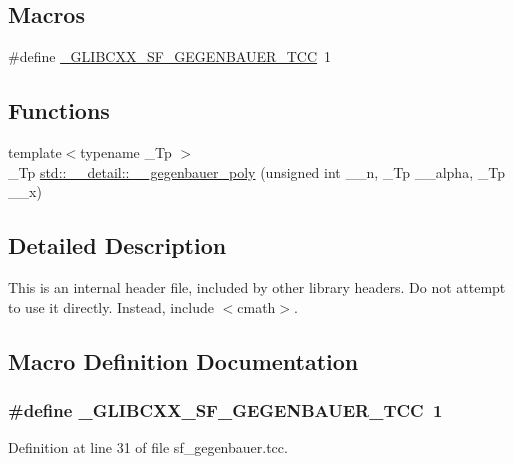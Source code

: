 \subsection*{Macros}
\begin{DoxyCompactItemize}
\item 
\#define \hyperlink{sf__gegenbauer_8tcc_abd7e8b1c4ef4ccdebedccbe78bb8e31b}{\+\_\+\+G\+L\+I\+B\+C\+X\+X\+\_\+\+S\+F\+\_\+\+G\+E\+G\+E\+N\+B\+A\+U\+E\+R\+\_\+\+T\+CC}~1
\end{DoxyCompactItemize}
\subsection*{Functions}
\begin{DoxyCompactItemize}
\item 
{\footnotesize template$<$typename \+\_\+\+Tp $>$ }\\\+\_\+\+Tp \hyperlink{namespacestd_1_1____detail_a5c2319a50d89d8067a46750708bf8563}{std\+::\+\_\+\+\_\+detail\+::\+\_\+\+\_\+gegenbauer\+\_\+poly} (unsigned int \+\_\+\+\_\+n, \+\_\+\+Tp \+\_\+\+\_\+alpha, \+\_\+\+Tp \+\_\+\+\_\+x)
\end{DoxyCompactItemize}


\subsection{Detailed Description}
This is an internal header file, included by other library headers. Do not attempt to use it directly. Instead, include $<$cmath$>$. 

\subsection{Macro Definition Documentation}
\subsubsection[{\texorpdfstring{\+\_\+\+G\+L\+I\+B\+C\+X\+X\+\_\+\+S\+F\+\_\+\+G\+E\+G\+E\+N\+B\+A\+U\+E\+R\+\_\+\+T\+CC}{_GLIBCXX_SF_GEGENBAUER_TCC}}]{\setlength{\rightskip}{0pt plus 5cm}\#define \+\_\+\+G\+L\+I\+B\+C\+X\+X\+\_\+\+S\+F\+\_\+\+G\+E\+G\+E\+N\+B\+A\+U\+E\+R\+\_\+\+T\+CC~1}\hypertarget{sf__gegenbauer_8tcc_abd7e8b1c4ef4ccdebedccbe78bb8e31b}{}\label{sf__gegenbauer_8tcc_abd7e8b1c4ef4ccdebedccbe78bb8e31b}


Definition at line 31 of file sf\+\_\+gegenbauer.\+tcc.

